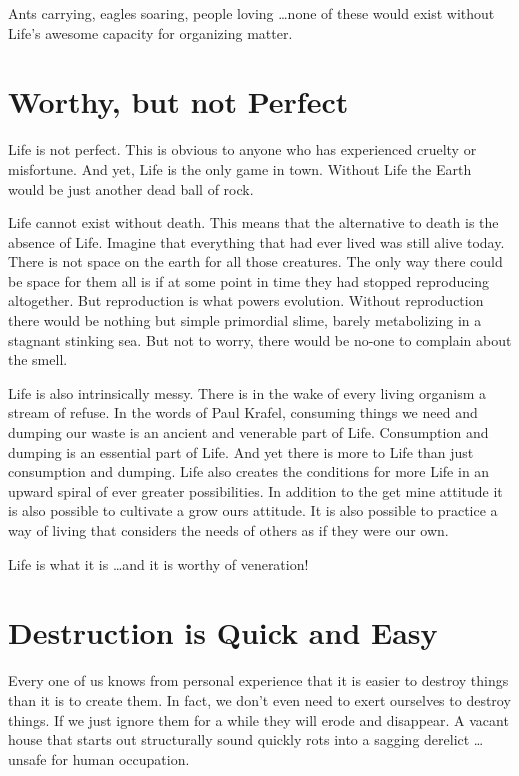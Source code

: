 \documentclass[ebook,11pt,openany,twoside,showtrims]{memoir}
\newcommand{\imagefacingchapter}[1]{
  \cleartoverso
  \clearpage \null
  \thispagestyle{cleared}
  \AddToShipoutPictureBG*{%
    \AtStockLowerLeft{%
      \texttt{[image: \#1]}
    }
  }
  \clearpage
}
\begin{document}
Ants carrying, eagles soaring, people loving \ldots none of these would exist
without Life's awesome capacity for organizing matter.

\imagefacingchapter{images/WhatIsWorthy-cropped}
\chapter{Worthy, but not Perfect}

Life is not perfect. This is obvious to anyone who has experienced cruelty or
misfortune. And yet, Life is the only game in town. Without Life the Earth
would be just another dead ball of rock.

Life cannot exist without death. This means that the alternative to death is
the absence of Life. Imagine that everything that had ever lived was still
alive today. There is not space on the earth for all those creatures. The only
way there could be space for them all is if at some point in time they had
stopped reproducing altogether. But reproduction is what powers evolution.
Without reproduction there would be nothing but simple primordial slime, barely
metabolizing in a stagnant stinking sea. But not to worry, there would be
no-one to complain about the smell.

Life is also intrinsically messy. There is in the wake of every living organism
a stream of refuse. In the words of Paul Krafel, consuming things we need and
dumping our waste is an ancient and venerable part of Life. Consumption and
dumping is an essential part of Life. And yet there is more to Life than just
consumption and dumping. Life also creates the conditions for more Life in an
upward spiral of ever greater possibilities. In addition to the get mine
attitude it is also possible to cultivate a grow ours attitude. It is also
possible to practice a way of living that considers the needs of others as if
they were our own.

Life is what it is \ldots and it is worthy of veneration!

\imagefacingchapter{images/CollapsingHouse}
\chapter{Destruction is Quick and Easy}

Every one of us knows from personal experience that it is easier to destroy
things than it is to create them. In fact, we don't even need to exert
ourselves to destroy things. If we just ignore them for a while they will erode
and disappear. A vacant house that starts out structurally sound quickly rots
into a sagging derelict \ldots unsafe for human occupation.
\end{document}
